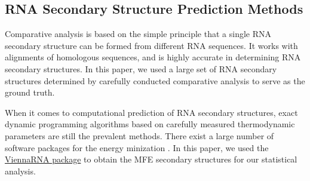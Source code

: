 \documentclass[10pt,letterpaper]{article}
\begin{document}
\subsection*{RNA Secondary Structure Prediction Methods}
Comparative analysis\cite{Gutell1992-hu} is based on the simple principle that a single RNA secondary structure can be formed from different RNA sequences. It works with alignments of homologous sequences, and is highly accurate in determining RNA secondary structures\cite{Gutell2002-ei}. In this paper, we used a large set of RNA secondary structures determined by carefully conducted comparative analysis  to serve as the ground truth.

When it comes to computational prediction of RNA secondary structures, exact dynamic programming algorithms based on carefully measured thermodynamic parameters are still the prevalent methods. There exist a large number of software packages for the energy minization \cite{Lorenz2011-eb, Markham2008-ku, Reuter2010-bw, Zadeh2011-eu, Hamada2009-yf, Ding2003-sv, Reeder2009-xl}. In this paper, we used the \href{https://www.tbi.univie.ac.at/RNA/}{ViennaRNA package} \cite{Lorenz2011-eb} to obtain the MFE secondary structures for our statistical analysis.
\end{document}
